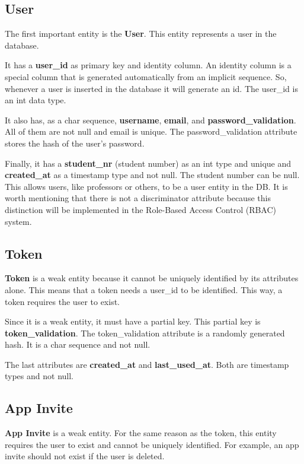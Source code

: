 \documentclass[a4paper,twoside,11pt]{article}
\begin{document}
\subsection*{User}
The first important entity is the \textbf{User}. This entity represents a user in the database.

It has a \textbf{user\_id} as primary key and identity column. An identity column is a special column that is generated automatically from an implicit sequence.
So, whenever a user is inserted in the database it will generate an id. The user\_id is an int data type. 

It also has, as a char sequence, \textbf{username}, \textbf{email}, and \textbf{password\_validation}. All of them are not null and email is unique. The password\_validation attribute stores the hash of the user's password.

Finally, it has a \textbf{student\_nr} (student number) as an int type and unique and \textbf{created\_at} as a timestamp type and not null.
The student number can be null. This allows users, like professors or others, to be a user entity in the DB. It is worth mentioning that there is not a discriminator attribute because 
this distinction will be implemented in the Role-Based Access Control (RBAC) system.

\subsection*{Token}
\textbf{Token} is a weak entity because it cannot be uniquely identified by its attributes alone. This means that a token needs a user\_id to be identified. This way, a token requires the user to exist.

Since it is a weak entity, it must have a partial key. This partial key is \textbf{token\_validation}. The token\_validation attribute is a randomly generated hash. It is a char sequence and not null.

The last attributes are \textbf{created\_at} and \textbf{last\_used\_at}. Both are timestamp types and not null. 

\subsection*{App Invite}
\textbf{App Invite} is a weak entity. For the same reason as the token, this entity requires the user to exist and cannot be uniquely identified. For example, an app invite should not exist if the user is deleted.
\end{document}
